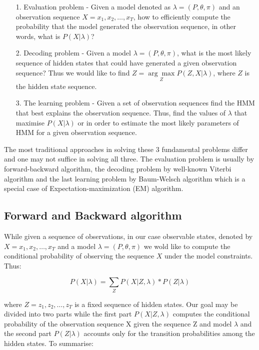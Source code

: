 \begin{itemize}
\item[1.] Evaluation problem - Given a model denoted as $\lambda = (P,\theta,\pi)$ and an observation sequence $X = x_1, x_2,\ldots,x_T$, how to efficiently compute the probability that the model generated the observation sequence, in other words, what is $P(X|\lambda)$? 
\item[2.] Decoding problem - Given a model $\lambda = (P,\theta,\pi)$, what is the most likely sequence of hidden states that could have generated a given observation sequence? Thus we would like to find $Z = \underset{Z}{\arg\max} P(Z,X|\lambda)$, where $Z$ is the hidden state sequence. 
\item[3.] The learning problem - Given a set of observation sequences find the HMM that best explains the observation sequence. Thus, find the values of $\lambda$ that maximise $P(X|\lambda)$ or in order to estimate the most likely parameters of HMM for a given observation sequence. 
\end{itemize}

The most traditional approaches in solving these 3 fundamental problems differ and one may not suffice in solving all three. The evaluation problem is usually by forward-backward algorithm, the decoding problem by well-known Viterbi algorithm and the last learning problem by Baum-Welsch algorithm which is a special case of Expectation-maximization (EM) algorithm. 

\subsection{Forward and Backward algorithm}

While given a sequence of observations, in our case observable states, denoted by $X = x_1,x_2,\ldots,x_T$ and a model $\lambda = (P,\theta,\pi)$ we wold like to compute the conditional probability of observing the sequence $X$ under the model constraints. Thus:

 \begin{equation}
P(X| \lambda) = \sum_Z P(X|Z,\lambda)*P(Z|\lambda)
\end{equation}

where $Z = z_1,z_2,\ldots,z_T$ is a fixed sequence of hidden states. Our goal may be divided into two parts while the first part $P(X|Z,\lambda)$ computes the conditional probability of the observation sequence X given the sequence Z and model $\lambda$ and the second part $P(Z|\lambda)$ accounts only for the transition probabilities among the hidden states. To summarise:

